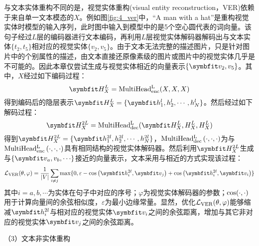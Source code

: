 
与文本实体重构不同的是，视觉实体重构(visual entity reconstruction，VER)依赖于来自单一文本模态的$X$。例如图\ref{fig:4_ver}中，“A man with a hat”是重构视觉实体时模型的输入序列，此时图中输入到模型中的是5个空心圆代表的词向量。该句子经过$L$层的编码器进行文本编码，再利用$L$层视觉实体解码器解码出与文本实体$\{t_2,t_5\}$相对应的视觉实体$\{v_2,v_5\}$。由于文本无法完整的描述图片，只是针对图片中的个别属性的描述，由文本直接还原像素级的图片或图片中的视觉实体几乎是不可能的。因此本章仅尝试生成与视觉实体相近的向量表示$\{\Vector{v_2,v_5}\}$。其中，$X$经过如下编码过程：
\begin{equation}
\Vector{H_X^L}={\rm{MultiHead_{enc}^L}}(X, X, X)
\end{equation}
得到编码后的隐层表示$\Vector{H_X^L}=\{\Vector{h_1^l,h_2^l,\cdots,h_N^l}\}$。然后经过如下解码过程：
\begin{equation}
\Vector{H_X^{2L}}={\rm{MultiHead_{dec}^L}}(\Vector{H_X^L, H_X^L, H_X^L})
\end{equation}
得到$\Vector{H_X^{2L}}=\{\Vector{h_1^{2l},h_2^{2l},\cdots,h_N^{2l}}\}$，${\rm MultiHead_{dec}^L}\left( \cdot,\cdot,\cdot \right)$为与${\rm MultiHead_{enc}^L}\left( \cdot,\cdot,\cdot \right)$具有相同结构的视觉实体解码器。然后利用$\Vector{H_X^{2L}}$生成与$\{\Vector{v_a,v_b,\cdots}\}$接近的向量表示，文本采用与相近的方式实现该过程：
\begin{equation}
\mathcal{L}_{\rm{VER}}(\theta, \varphi)=
    \frac{1}{{\vert}V{\vert}}
    \mathop{\sum}_{i \neq j}{\max}\{0, \varepsilon - {\rm{cos}}\left( \Vector{h_i^{2l}}, \Vector{v_j} \right) + {\rm{cos}}\left( \Vector{h_i^{2l}}, \Vector{v_i} \right)\}
\end{equation}
%
其中$i=a,b,\cdots$为实体在句子中对应的序号；$\varphi$为视觉实体解码器的参数；${\rm{cos}}(\cdot,\cdot)$用于计算向量间的余弦相似度，$\varepsilon$为最小边缘常量。显然，优化$\mathcal{L}_{\rm{VER}}(\theta,\varphi)$能够缩减$\Vector{h_i^{2l}}$与相对应的视觉实体$\Vector{v_i}$之间的余弦距离，增加与其它非对应的视觉实体$\Vector{v_j}$之间的余弦距离。

{\sffamily （3）文本非实体重构}


